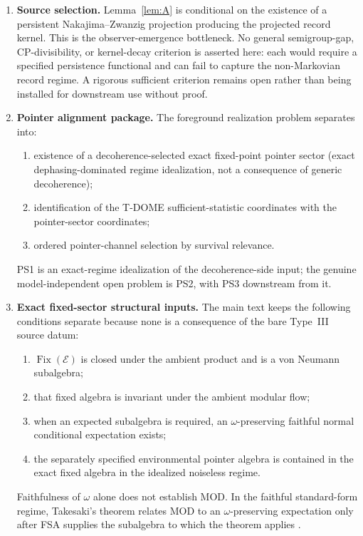 \documentclass[12pt]{article}
\theoremstyle{definition}
\theoremstyle{remark}
\begin{document}
\begin{enumerate}
\item \textbf{Source selection.}
Lemma~\ref{lem:A} is conditional on the existence of a persistent
Nakajima--Zwanzig projection producing the projected record kernel.
This is the observer-emergence bottleneck. No general semigroup-gap,
CP-divisibility, or kernel-decay criterion is asserted here: each would
require a specified persistence functional and can fail to capture the
non-Markovian record regime. A rigorous sufficient criterion remains
open rather than being installed for downstream use without proof.

\item \textbf{Pointer alignment package.}
The foreground realization problem separates into:
\begin{enumerate}
\item[(PS1)] existence of a decoherence-selected exact fixed-point
  pointer sector (exact dephasing-dominated regime idealization, not a
  consequence of generic decoherence);
\item[(PS2)] identification of the T-DOME sufficient-statistic
  coordinates with the pointer-sector coordinates;
\item[(PS3)] ordered pointer-channel selection by survival relevance.
\end{enumerate}
PS1 is an exact-regime idealization of the decoherence-side input; the
genuine model-independent open problem is PS2, with PS3 downstream
from it.

\item \textbf{Exact fixed-sector structural inputs.}
The main text keeps the following conditions separate because none is a
consequence of the bare Type~III source datum:
\begin{enumerate}
\item[(FSA)] \(\operatorname{Fix}(\mathcal E)\) is closed under the
  ambient product and is a von Neumann subalgebra;
\item[(MOD)] that fixed algebra is invariant under the ambient modular
  flow;
\item[(EXP)] when an expected subalgebra is required, an
  \(\omega\)-preserving faithful normal conditional expectation exists;
\item[(PTR)] the separately specified environmental pointer algebra is
  contained in the exact fixed algebra in the idealized noiseless
  regime.
\end{enumerate}
Faithfulness of \(\omega\) alone does not establish MOD. In the faithful
standard-form regime, Takesaki's theorem relates MOD to an
\(\omega\)-preserving expectation only after FSA supplies the subalgebra
to which the theorem applies \cite{Takesaki1972,FrigerioVerri1982}.


\end{enumerate}
\end{document}
